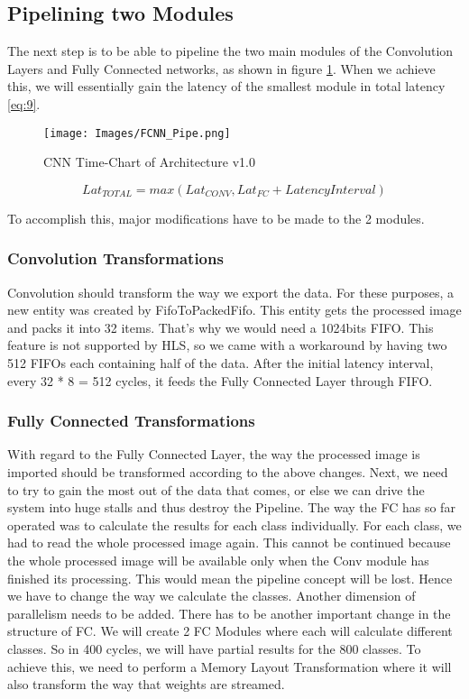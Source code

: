 \subsection{Pipelining two Modules}
The next step is to be able to pipeline the two main modules of the Convolution Layers and Fully Connected networks, as shown in figure \ref{fig:cnn_pipe}. When we achieve this, we will essentially gain the latency of the smallest module in total latency \ref{eq:9}.

 \begin{figure}[h]
\centering
\texttt{[image: Images/FCNN\_Pipe.png]} 
\decoRule
\caption[CNN Time-Chart (Arch1)]{CNN Time-Chart of Architecture v1.0}
\label{fig:cnn_pipe}
\end{figure}
 
\begin{equation}   \label{eq:9}
{
Lat_{TOTAL}=max(Lat_{CONV},Lat_{FC}+LatencyInterval)
}
\end{equation}
 
To accomplish this, major modifications have to be made to the 2 modules.

\subsubsection{Convolution Transformations}
Convolution should transform the way we export the data. For these purposes, a new entity was created by FifoToPackedFifo. This entity gets the processed image and packs it into 32 items. That's why we would need a 1024bits FIFO. This feature is not supported by HLS, so we came with a workaround by having two 512 FIFOs each containing half of the data. After the initial latency interval, every 32 * 8 = 512 cycles, it feeds the Fully Connected Layer through FIFO.

\subsubsection{Fully Connected Transformations}
With regard to the Fully Connected Layer, the way the processed image is imported should be transformed according to the above changes. Next, we need to try to gain the most out of the data that comes, or else we can drive the system into huge stalls and thus destroy the Pipeline. The way the FC has so far operated was to calculate the results for each class individually. For each class, we had to read the whole processed image again. This cannot be continued because the whole processed image will be available only when the Conv module has finished its processing. This would mean the pipeline concept will be lost. Hence we have to change the way we calculate the classes. Another dimension of parallelism needs to be added. There has to be another important change in the structure of FC. We will create 2 FC Modules where each will calculate different classes. So in 400 cycles, we will have partial results for the 800 classes. To achieve this, we need to perform a Memory Layout Transformation where it will also transform the way that weights are streamed. 


